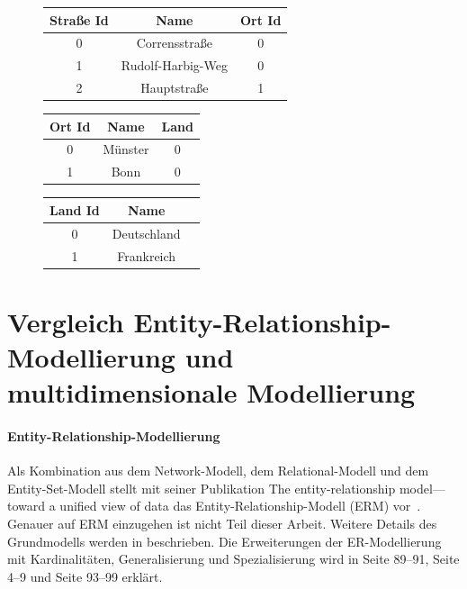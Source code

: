 \documentclass[
  language=german, %
  type=bachelor%
]{isthesis}
\begin{document}
\begin{content}
  \begin{figure}[caption={Beispiel der Dimensionstabellen \textit{Ort} im Snowflake-Schema}, label={table:dimension-table-snow}]
    \footnotesize
    \begin{tabular}{c c c }
      Straße Id & Name & Ort Id \\
      \toprule
      0 & Corrensstraße & 0 \\
      1 & Rudolf-Harbig-Weg & 0 \\
      2 & Hauptstraße & 1 \\
    \end{tabular}
    \begin{tabular}{c c c}
      Ort Id & Name & Land \\
      \toprule
      0 & Münster & 0 \\
      1 & Bonn & 0 \\
    \end{tabular}
    \begin{tabular}{c c c }
      Land Id & Name \\
      \toprule
      0 & Deutschland \\
      1 & Frankreich \\
    \end{tabular}
  \end{figure}

  \section{Vergleich Entity-Relationship-Modellierung und multidimensionale Modellierung}

  \paragraph{Entity-Relationship-Modellierung} Als Kombination aus dem
  Network-Modell, dem Relational-Modell und dem Entity-Set-Modell stellt
  \textsc{\citeauthor{chen1976entity}} \citeyear{chen1976entity} mit seiner Publikation
  \glqq{}The entity-relationship model—toward a unified view of data\grqq{} das
  Entity-Relationship-Modell (\acrshort{ERM}) vor~\cite[][S. 2]{chen1976entity}.  Genauer
  auf \acrshort{ERM} einzugehen ist nicht Teil dieser Arbeit. Weitere Details
  des Grundmodells werden in \textsc{\cite{chen1976entity}} beschrieben. Die
  Erweiterungen der ER-Modellierung mit Kardinalitäten, Generalisierung und
  Spezialisierung wird in \textsc{\cite{becker2004handelsinformationssysteme}}
  Seite 89--91, \textsc{\cite{becker2012grundsatze}} Seite 4--9 und
  \textsc{\cite{schutte2013grundsatze}} Seite 93--99 erklärt.


\end{content}
\end{document}
